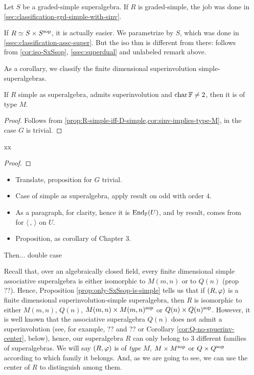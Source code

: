 Let $S$ be a graded-simple superalgebra.  
If $R$ is graded-simple, the job was done in \cref{sec:classification-grd-simple-with-sinv}.



If $R \simeq S\times S^{\mathrm{sop}}$, it is actually easier. 
We parametrize by $S$, which was done in \cref{ssec:classification-assc-super}. 
But the iso thm is different from there: follows from \cref{cor:iso-SxSsop},  \cref{ssec:superdual} and unlabeled remark above. 

As a corollary, we classify the finite dimensional superinvolution simple-superalgebras. 

\begin{lemma}
    If $R$ simple as superalgebra, admits superinvolution and $\operatorname{char} \mathbb{F}\neq 2$, then it is of type $M$.
\end{lemma}

\begin{proof}
    Follows from \cref{prop:R-simple-iff-D-simple,cor:sinv-implies-type-M}, in the case $G$ is trivial. 
\end{proof}

\begin{cor}
    xx
\end{cor}

\begin{proof}
    
\end{proof}

\begin{itemize}
    \item Translate, proposition for $G$ trivial.
    \item Case of simple as superalgebra, apply result on odd with order $4$.
    \item As a paragraph, for clarity, hence it is $\operatorname{End}_{\mathbb{F}} (U)$, and by result, comes from for $\langle \, , \, \rangle$ on $U$.
    \item Proposition, as corollary of Chapter 3.
\end{itemize}

Then... double case

Recall that, over an algebraically closed field, every finite dimensional simple associative superalgebra is either isomorphic to $M(m,n)$ or to $Q(n)$ (prop ??).
Hence, Proposition \ref{prop:only-SxSsop-is-simple} tells us that if $(R, \varphi)$ is a  finite dimensional superinvolution-simple superalgebra, then $R$ is isomorphic to either $M(m,n)$, $Q(n)$, $M(m,n) \times M(m,n)^{\mathrm{sop}}$ or $Q(n) \times Q(n)^{\mathrm{sop}}$.
However, it is well known that the associative superalgebra $Q(n)$ does not admit a superinvolution (see, for example, ?? and ?? or Corollary \ref{cor:Q-no-spuerinv-center}, below),
hence, our superalgebra $R$ can only belong to 3 different families of superalgebras.
We will say $(R,\varphi)$ is of \emph{type} $M$, $M\times M^{\mathrm{sop}}$ or $Q\times Q^{\mathrm{sop}}$ according to which family it belongs.
And, as we are going to see, we can use the center of $R$ to distinguish among them.

